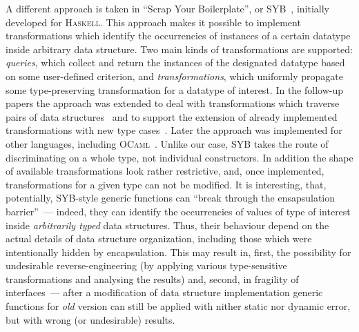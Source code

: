 A different approach is taken in ``Scrap Your Boilerplate'', or SYB~\cite{SYB}, initially developed for \textsc{Haskell}. This approach makes it
possible to implement transformations which identify the occurrencies of instances of a certain datatype inside arbitrary data structure. Two main
kinds of transformations are supported: \emph{queries}, which collect and return the instances of the designated datatype based on some user-defined
criterion, and \emph{transformations}, which uniformly propagate some type-preserving transformation for a datatype of interest. In the follow-up papers
the approach was extended to deal with transformations which traverse pairs of data structures~\cite{SYB1} and to support the extension of already implemented
transformations with new type cases~\cite{SYB2}. Later the approach was implemented  for other languages, including \textsc{OCaml}~\cite{SYBOCaml,Staged}.
Unlike our case, SYB takes the route of discriminating on a whole type, not individual constructors. In addition the shape of available transformations look rather
restrictive, and, once implemented, transformations for a given type can not be modified. It is interesting, that, potentially, SYB-style generic functions
can ``break through the ensapsulation barrier''~--- indeed, they can identify the occurrencies of values of type of interest inside \emph{arbitrarily typed}
data structures. Thus, their behaviour depend on the actual details of data structure organization, including those which were intentionally hidden by encapsulation.
This may result in, first, the possibility for undesirable reverse-engineering (by applying various type-sensitive transformations and analysing the results) and,
second, in fragility of interfaces~--- after a modification of data structure implementation generic functions for \emph{old} version can still be applied with
nither static nor dynamic error, but with wrong (or undesirable) results. 

